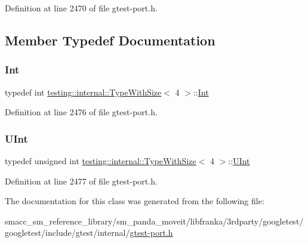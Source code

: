 Definition at line 2470 of file gtest-\/port.\+h.



\subsection{Member Typedef Documentation}
\mbox{\label{classtesting_1_1internal_1_1TypeWithSize_3_014_01_4_a80351860c00ed665e73f952143f4484a}} 
\subsubsection{\texorpdfstring{Int}{Int}}
{\footnotesize\ttfamily typedef int \hyperlink{classtesting_1_1internal_1_1TypeWithSize}{testing\+::internal\+::\+Type\+With\+Size}$<$ 4 $>$\+::\hyperlink{classtesting_1_1internal_1_1TypeWithSize_3_014_01_4_a80351860c00ed665e73f952143f4484a}{Int}}



Definition at line 2476 of file gtest-\/port.\+h.

\mbox{\label{classtesting_1_1internal_1_1TypeWithSize_3_014_01_4_a7d559570f830bf35d095eeb94d98de58}} 
\subsubsection{\texorpdfstring{U\+Int}{UInt}}
{\footnotesize\ttfamily typedef unsigned int \hyperlink{classtesting_1_1internal_1_1TypeWithSize}{testing\+::internal\+::\+Type\+With\+Size}$<$ 4 $>$\+::\hyperlink{classtesting_1_1internal_1_1TypeWithSize_3_014_01_4_a7d559570f830bf35d095eeb94d98de58}{U\+Int}}



Definition at line 2477 of file gtest-\/port.\+h.



The documentation for this class was generated from the following file\+:\begin{DoxyCompactItemize}
\item 
smacc\+\_\+sm\+\_\+reference\+\_\+library/sm\+\_\+panda\+\_\+moveit/libfranka/3rdparty/googletest/googletest/include/gtest/internal/\hyperlink{gtest-port_8h}{gtest-\/port.\+h}\end{DoxyCompactItemize}
